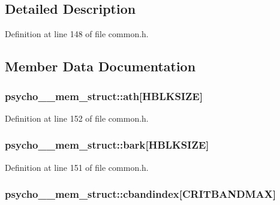 \subsection{Detailed Description}


Definition at line 148 of file common.\+h.



\subsection{Member Data Documentation}
\subsubsection[{\texorpdfstring{ath}{ath}}]{ psycho\+\_\+\_\+mem\+\_\+struct\+::ath\mbox{[}{\bf H\+B\+L\+K\+S\+I\+ZE}\mbox{]}}\hypertarget{structpsycho__3__mem__struct_adb99d8c4ffcf545625011df574e062bf}{}\label{structpsycho__3__mem__struct_adb99d8c4ffcf545625011df574e062bf}


Definition at line 152 of file common.\+h.

\subsubsection[{\texorpdfstring{bark}{bark}}]{ psycho\+\_\+\_\+mem\+\_\+struct\+::bark\mbox{[}{\bf H\+B\+L\+K\+S\+I\+ZE}\mbox{]}}\hypertarget{structpsycho__3__mem__struct_a56c7889451c3574bfe6b1e77e9fbcc38}{}\label{structpsycho__3__mem__struct_a56c7889451c3574bfe6b1e77e9fbcc38}


Definition at line 151 of file common.\+h.

\subsubsection[{\texorpdfstring{cbandindex}{cbandindex}}]{ psycho\+\_\+\_\+mem\+\_\+struct\+::cbandindex\mbox{[}{\bf C\+R\+I\+T\+B\+A\+N\+D\+M\+AX}\mbox{]}}\hypertarget{structpsycho__3__mem__struct_a16a4ab0e46c2b4cbc2d61dd63f8285b3}{}\label{structpsycho__3__mem__struct_a16a4ab0e46c2b4cbc2d61dd63f8285b3}


